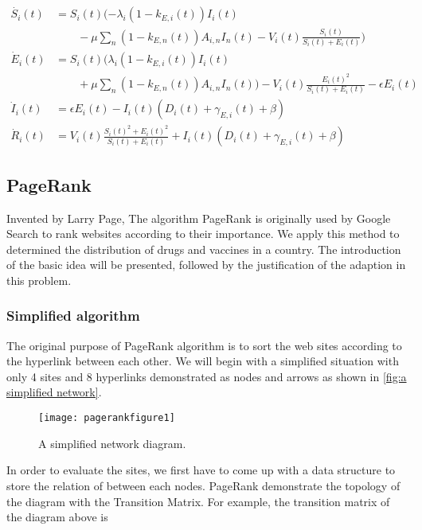 \begin{align}
\dot{S_{i}}(t) &= S_{i}(t)(-\lambda_{i} (1-k_{E,i}(t))  I_{i}(t)  \nonumber\\
\label{eq:seirs}
&\qquad - \mu  \sum_{n} (1-k_{E,n}(t)) A_{i,n} I_{n}(t) - V_{i}(t)  \frac{S_{i}(t)}{S_{i}(t) + E_{i}(t)}) \\
\dot{E}_{i}(t) &= S_{i}(t)(\lambda_{i} (1-k_{E,i}(t))  I_{i}(t)  \nonumber\\
\label{eq:seire}
&\qquad + \mu  \sum_{n} (1-k_{E,n}(t)) A_{i,n} I_{n}(t)) - V_{i}(t)  \frac{E_{i}(t)^2}{S_{i}(t) + E_{i}(t)} - \epsilon E_{i}(t)\\
\label{eq:seiri}
\dot{I}_{i}(t) &= \epsilon E_{i}(t) - {I}_i(t)(D_{i}(t) + \gamma_{E,i}(t) + \beta) \\
\dot{R}_{i}(t) &= V_{i}(t)  \frac{S_{i}(t)^2+E_{i}(t)^2}{S_{i}(t) + E_{i}(t)
}+ {I}_i(t)(D_{i}(t) + \gamma_{E,i}(t) + \beta)
\label{eq:seirr}
\end{align}


\subsection{PageRank}
Invented by Larry Page, The algorithm PageRank is originally used by Google Search to rank websites according to their importance. We apply this method to determined the distribution of drugs and vaccines in a country. The introduction of the basic idea will be presented, followed by the justification of the adaption in this problem.

\subsubsection{Simplified algorithm}
The original purpose of PageRank algorithm is to sort the web sites according to the hyperlink between each other. We will begin with a simplified situation with only 4 sites and 8 hyperlinks demonstrated as nodes and arrows as shown in \autoref{fig:a simplified network}.\cite{kard12}
    
\begin{figure}[ht]
\small
\centering
\texttt{[image: pagerankfigure1]}
\caption{A simplified network diagram. }
\label{fig:a simplified network}
\end{figure}
    

In order to evaluate the sites, we first have to come up with a data structure to store the relation of between each nodes. PageRank demonstrate the topology of the diagram with the Transition Matrix. For example, the transition matrix of the diagram above is  

